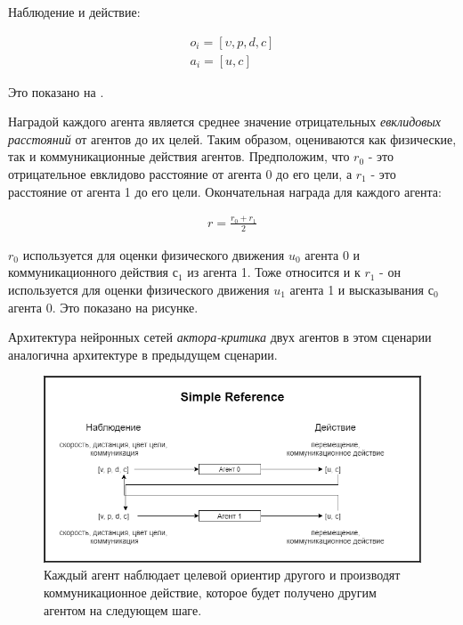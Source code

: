 Наблюдение и действие:

\begin{equation}
    \begin{multlined}
        o_i = [\upsilon, p, d, c] \\
        a_i = [u, c]
    \end{multlined}
\end{equation}


Это показано на .

Наградой каждого агента является среднее значение отрицательных \textit{евклидовых расстояний} от агентов до их целей. Таким образом, оцениваются как физические, так и коммуникационные действия агентов. Предположим, что $r_0$ - это отрицательное евклидово расстояние от агента 0 до его цели, а $r_1$ - это расстояние от агента 1 до его цели. Окончательная награда для каждого агента:

\begin{equation}
    \begin{multlined}
        r = \frac{r_0 + r_1}{2}
    \end{multlined}
\end{equation}

$r_0$ используется для оценки физического движения $u_0$ агента 0 и коммуникационного действия $с_1$ из агента 1. Тоже относится и к $r_1$ - он используется для оценки физического движения $u_1$ агента 1 и высказывания $с_0$ агента 0. Это показано на рисунке.

Архитектура нейронных сетей \textit{актора-критика} двух агентов в этом сценарии аналогична архитектуре в предыдущем сценарии.

\begin{figure}[ht!]
    \center
    \includegraphics [scale=0.60] {my_folder/images/ch4/simple_reference.png}
    \caption{Каждый агент наблюдает целевой ориентир другого и производят коммуникационное действие, которое будет получено другим агентом на следующем шаге.}
    \label{fig:exp-sr}
\end{figure}

